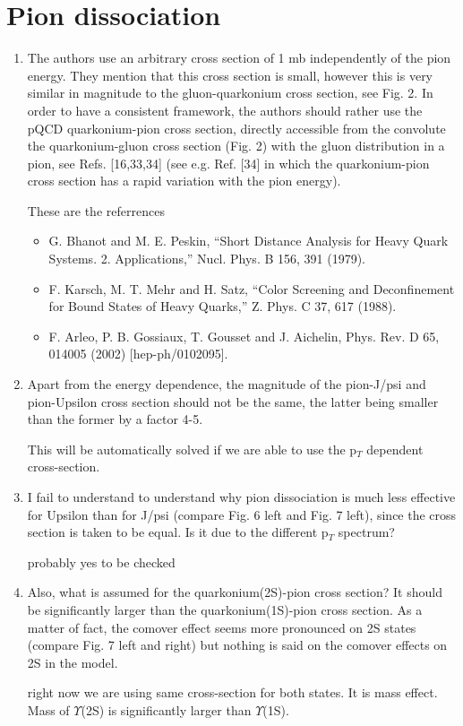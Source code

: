 \documentclass[aps,prc,preprint,superscriptaddress,showpacs,showkeys]{revtex4-1}
\begin{document}
\section{Pion dissociation}

\begin{enumerate}

\item { \color{red} The authors use an arbitrary cross section of 1 mb independently of
the pion energy. They mention that this cross section is small,
however this is very similar in magnitude to the gluon-quarkonium
cross section, see Fig. 2. 
In order to have a consistent framework, the authors should rather use
the pQCD quarkonium-pion cross section, directly accessible from the
convolute the quarkonium-gluon cross section (Fig. 2) with the gluon
distribution in a pion, see Refs. [16,33,34] (see e.g. Ref. [34] in
which the quarkonium-pion cross section has a rapid variation with the
pion energy).}

{\color{blue} These are the referrences 

\begin{itemize}
 \item G. Bhanot and M. E. Peskin, “Short Distance Analysis for Heavy Quark Systems. 2. Applications,” Nucl. Phys. B 156, 391 (1979).
 \item  F. Karsch, M. T. Mehr and H. Satz, “Color Screening and Deconfinement for Bound States of Heavy Quarks,” Z. Phys. C 37, 617 (1988).
 \item  F. Arleo, P. B. Gossiaux, T. Gousset and J. Aichelin, Phys. Rev. D 65, 014005 (2002) [hep-ph/0102095].
\end{itemize}
}



\item { \color{red} Apart from the energy dependence, the magnitude of the pion-J/psi and
pion-Upsilon cross section should not be the same, the latter being
smaller than the former by a factor 4-5.}

{\color{blue} This will be automatically solved if we are able to use the p$_{T}$} dependent cross-section.


\item { \color{red} I fail to understand to understand why pion dissociation is much
less effective for Upsilon than for J/psi (compare Fig. 6 left and
Fig. 7 left), since the cross section is taken to be equal. Is it due
to the different p$_T$ spectrum?}

{ \color{blue} probably yes to be checked}

\item { \color{red} Also, what is assumed for the quarkonium(2S)-pion cross section? It
should be significantly larger than the quarkonium(1S)-pion cross
section. As a matter of fact, the comover effect seems more pronounced
on 2S states (compare Fig. 7 left and right) but nothing is said on
the comover effects on 2S in the model.}

{ \color{blue} right now we are using same cross-section for both states. It is mass effect. Mass of
$\Upsilon$(2S) is significantly larger than $\Upsilon$(1S).}


\end{enumerate}
\end{document}

